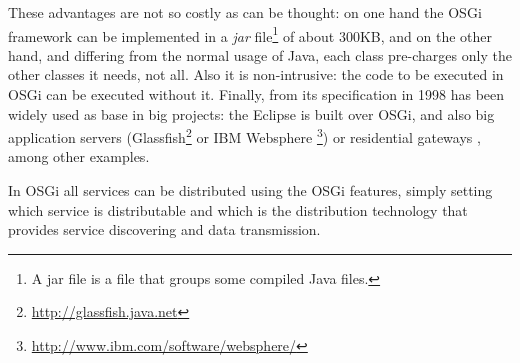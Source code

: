 These advantages are not so
                               costly as can be thought: on one hand the OSGi
                                framework can be implemented in a
                                {\em jar} file\footnote{A jar file is
                                a file that groups some compiled Java
                                files.} of about 300KB, and on the other hand, and differing from
                                the normal usage of Java, each
                                class pre-charges only the other
                                classes it needs, not all. Also it is
                                non-intrusive: the code to be
                                executed in OSGi can be executed
                                without it. Finally, from its
                                specification in 1998 has been widely
                                used as base in big projects: the
                                Eclipse  is built over OSGi, and
                                also big application servers
                               (Glassfish\footnote{\url{http://glassfish.java.net}} 
                               or IBM Websphere \footnote{\url{http://www.ibm.com/software/websphere/}}) or
                               residential gateways
                               \cite{GarciaSanchez2013Gateway}, among other
                               examples. 



In OSGi all services can be distributed using the OSGi
features, simply setting which service is distributable and which is
the distribution technology that provides service discovering and data
transmission.   %

